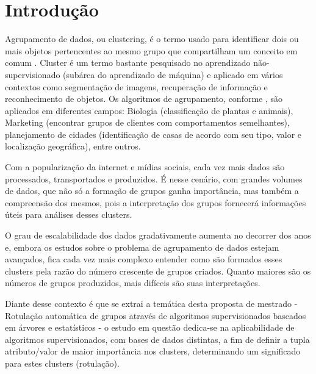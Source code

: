 

\chapter{Introdução} \label{cap:introd}

Agrupamento de dados, ou clustering, é o termo usado para identificar dois ou mais objetos pertencentes ao mesmo grupo que compartilham um conceito em comum \cite{Kumar2013}. Cluster é um termo bastante pesquisado no aprendizado não-supervisionado (subárea do aprendizado de máquina) e aplicado em vários contextos como segmentação de imagens, recuperação de informação e reconhecimento de objetos. Os algoritmos de agrupamento, conforme \cite{Kumar2013}, são aplicados em diferentes campos: Biologia (classificação de plantas e animais), Marketing (encontrar grupos de clientes com comportamentos semelhantes), planejamento de cidades (identificação de casas de acordo com seu tipo, valor e localização geográfica), entre outros.

Com a popularização da internet e mídias sociais, cada vez mais dados são processados, transportados e produzidos. É nesse cenário, com grandes volumes de dados, que não só a formação de grupos ganha importância, mas também a compreensão dos mesmos, pois a interpretação dos grupos fornecerá informações úteis para análises desses clusters.


O grau de escalabilidade dos dados gradativamente aumenta no decorrer dos anos e, embora os estudos sobre o problema de agrupamento de dados estejam avançados, fica cada vez mais complexo entender como são formados esses clusters pela razão do número crescente de grupos criados. Quanto maiores são os números de grupos produzidos, mais difíceis são suas interpretações. 

Diante desse contexto é que se extrai a temática desta proposta de mestrado - Rotulação automática de grupos através de algoritmos supervisionados baseados em árvores e estatísticos - o estudo em questão dedica-se na aplicabilidade de algoritmos supervisionados, com bases de dados distintas, a fim de definir a tupla atributo/valor de maior importância nos clusters, determinando um significado para estes clusters (rotulação).


